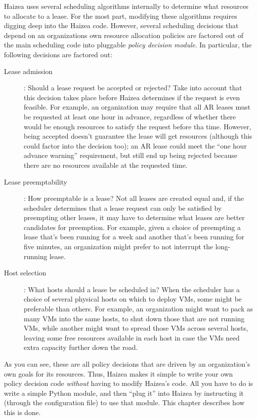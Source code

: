 Haizea uses several scheduling algorithms internally to determine what resources to allocate to a lease. For the most part, modifying these algorithms requires digging deep into the Haizea code. However, several scheduling decisions that depend on an organizations own resource allocation policies are factored out of the main scheduling code into pluggable \emph{policy decision module}. In particular, the following decisions are factored out:

\begin{description}
 \item[Lease admission]: Should a lease request be accepted or rejected? Take into account that this decision takes place before Haizea determines if the request is even feasible. For example, an organization may require that all AR leases must be requested at least one hour in advance, regardless of whether there would be enough resources to satisfy the request before tha time. However, being accepted doesn't guarantee the lease will get resources (although this could factor into the decision too); an AR lease could meet the ``one hour advance warning'' requirement, but still end up being rejected because there are no resources available at the requested time.
 \item[Lease preemptability]: How preemptable is a lease? Not all leases are created equal and, if the scheduler determines that a lease request can only be satisfied by preempting other leases, it may have to determine what leases are better candidates for preemption. For example, given a choice of preempting a lease that's been running for a week and another that's been running for five minutes, an organization might prefer to not interrupt the long-running lease.
 \item[Host selection]: What hosts should a lease be scheduled in? When the scheduler has a choice of several physical hosts on which to deploy VMs, some might be preferable than others. For example, an organization might want to pack as many VMs into the same hosts, to shut down those that are not running VMs, while another might want to spread those VMs across several hosts, leaving some free resources available in each host in case the VMs need extra capacity further down the road.
\end{description}

As you can see, these are all policy decisions that are driven by an organization's own goals for its resources. Thus, Haizea makes it simple to write your own policy decision code \emph{without} having to modify Haizea's code. All you have to do is write a simple Python module, and then ``plug it'' into Haizea by instructing it (through the configuration file) to use that module. This chapter describes how this is done.

